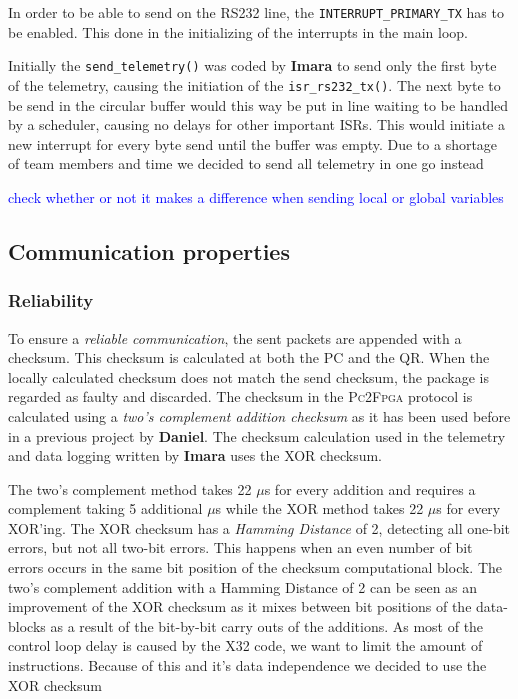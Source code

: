 \documentclass{article}
\newcommand\todo[1]{\textcolor{blue}{#1}} %
\begin{document}
In order to be able to send on the RS232 line, the \texttt{INTERRUPT\_PRIMARY\_TX} has to be enabled. This done in the initializing of the interrupts in the main loop. 

Initially the \texttt{send\_telemetry()} was coded by \textbf{Imara} to send only the first byte of the telemetry, causing the initiation of the \texttt{isr\_rs232\_tx()}. The next byte to be send in the circular buffer would this way be put in line waiting to be handled by a scheduler, causing no delays for other important ISRs. This would initiate a new interrupt for every byte send until the buffer was empty. Due to a shortage of team members and time we decided to send all telemetry in one go instead

\todo{check whether or not it makes a difference when sending local or global variables}

% 

\subsection{Communication properties}
\subsubsection{Reliability} 
To ensure a \emph{reliable communication}, the sent packets are appended with a checksum.  This checksum is calculated at both the PC and the QR. When the locally calculated checksum does not match the send checksum, the package is regarded as faulty and discarded. The checksum in the \textsc{Pc2Fpga} protocol is calculated using a \emph{two's complement addition checksum} as it has been used before in a previous project by \textbf{Daniel}. The checksum calculation used in the telemetry and data logging written by \textbf{Imara} uses the \textsc{XOR} checksum.  

The two's complement method takes 22 $\mu$s for every addition and requires a complement taking 5 additional $\mu$s while the \textsc{XOR} method takes 22 $\mu$s for every \textsc{XOR}'ing. The \textsc{XOR} checksum has a \emph{Hamming Distance} of 2, detecting all one-bit errors, but not all two-bit errors. This happens when an even number of bit errors occurs in the same bit position of the checksum computational block. The two's complement addition with a Hamming Distance of 2 can be seen as an improvement of the \textsc{XOR} checksum as it mixes between bit positions of the data-blocks as a result of the bit-by-bit carry outs of the additions. As most of the control loop delay is caused by the X32 code, we want to limit the amount of instructions. Because of this and it's data independence we decided to use the \textsc{XOR} checksum 
\end{document}
